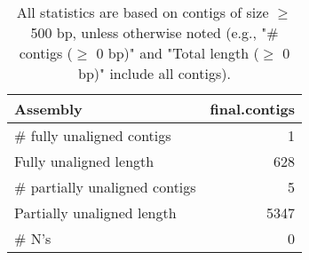 \documentclass[12pt,a4paper]{article}
\begin{document}
\begin{table}[ht]
\begin{center}
\caption{All statistics are based on contigs of size $\geq$ 500 bp, unless otherwise noted (e.g., "\# contigs ($\geq$ 0 bp)" and "Total length ($\geq$ 0 bp)" include all contigs).}
\begin{tabular}{|l*{1}{|r}|}
\hline
Assembly & final.contigs \\ \hline
\# fully unaligned contigs & 1 \\ \hline
Fully unaligned length & 628 \\ \hline
\# partially unaligned contigs & 5 \\ \hline
Partially unaligned length & 5347 \\ \hline
\# N's & 0 \\ \hline
\end{tabular}
\end{center}
\end{table}
\end{document}
